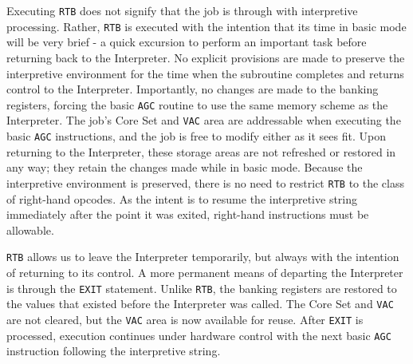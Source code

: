 \documentclass[refcap, oxford]{ahsan}
\begin{document}
Executing \texttt{RTB} does not signify that the job is through with interpretive processing. Rather, \texttt{RTB} is executed with the intention that its time in basic mode will be very brief - a quick excursion to perform an important task before returning back to the Interpreter. No explicit provisions are made to preserve the interpretive environment for the time when the subroutine completes and returns control to the Interpreter. Importantly, no changes are made to the banking registers, forcing the basic \texttt{AGC} routine to use the same memory scheme as the Interpreter. The job's Core Set and \texttt{VAC} area are addressable when executing the basic \texttt{AGC} instructions, and the job is free to modify either as it sees fit. Upon returning to the Interpreter, these storage areas are not refreshed or restored in any way; they retain the changes made while in basic mode. Because the interpretive environment is preserved, there is no need to restrict \texttt{RTB} to the class of right-hand opcodes. As the intent is to resume the interpretive string immediately after the point it was exited, right-hand instructions must be allowable.

\texttt{RTB} allows us to leave the Interpreter temporarily, but always with the intention of returning to its control. A more permanent means of departing the Interpreter is through the \texttt{EXIT} statement. Unlike \texttt{RTB}, the banking registers are restored to the values that existed before the Interpreter was called. The Core Set and \texttt{VAC} are not cleared, but the \texttt{VAC} area is now available for reuse. After \texttt{EXIT} is processed, execution continues under hardware control with the next basic \texttt{AGC} instruction following the interpretive string.

\fi
\end{document}
